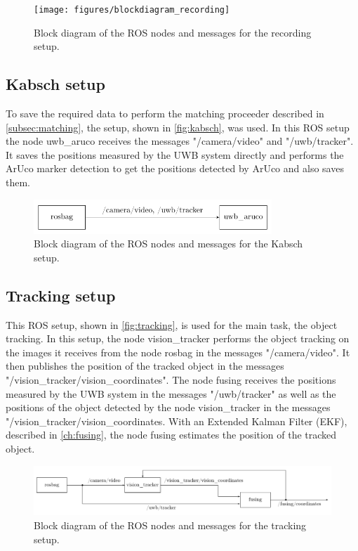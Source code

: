 \begin{figure}[h]\centering
	\texttt{[image: figures/blockdiagram\_recording]}
	\caption{Block diagram of the ROS nodes and messages for the recording setup.}\label{fig:recording}
\end{figure}

\subsection{Kabsch setup}\label{subsec:kabsch}
To save the required data to perform the matching proceeder described in \autoref{subsec:matching}, the setup, shown in \autoref{fig:kabsch}, was used. In this ROS setup the node uwb\_aruco receives the messages "/camera/video" and "/uwb/tracker". It saves the positions measured by the UWB system directly and performs the ArUco marker detection to get the positions detected by ArUco and also saves them.

\begin{figure}[h]\centering
	\includegraphics[width=0.8\textwidth]{figures/blockdiagram_kabsch}
	\caption{Block diagram of the ROS nodes and messages for the Kabsch setup.}\label{fig:kabsch}
\end{figure}

\subsection{Tracking setup}\label{subsec:tracking}
This ROS setup, shown in \autoref{fig:tracking}, is used for the main task, the object tracking. In this setup, the node vision\_tracker performs the object tracking on the images it receives from the node rosbag in the messages "/camera/video". It then publishes the position of the tracked object in the messages "/vision\_tracker/vision\_coordinates". The node fusing receives the positions measured by the UWB system in the messages "/uwb/tracker" as well as the positions of the object detected by the node vision\_tracker in the messages "/vision\_tracker/vision\_coordinates. With an Extended Kalman Filter (EKF), described in \autoref{ch:fusing}, the node fusing estimates the position of the tracked object.

\begin{figure}[h]\centering
	\includegraphics[width=1.0\textwidth]{figures/blockdiagram_tracking}
	\caption{Block diagram of the ROS nodes and messages for the tracking setup.}\label{fig:tracking}
\end{figure}
